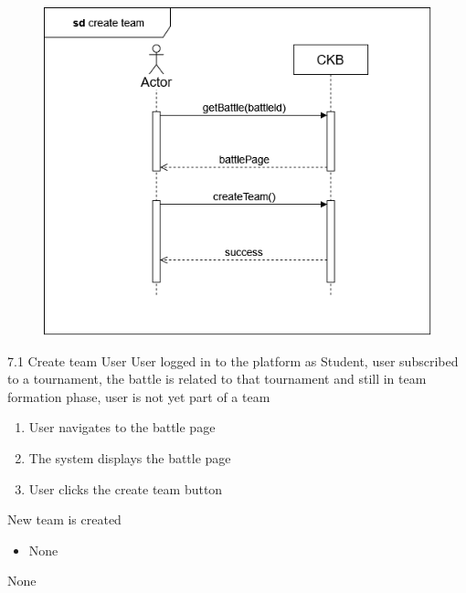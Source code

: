 \usecase
{
    \begin{figure}[H]
        \centering
        \includegraphics[width=\textwidth]{src/sequence_diagrams/createteam.png}
    \end{figure}
}
{7.1}
{Create team} %
{User} %
{User logged in to the platform as Student, user subscribed to a tournament, the battle is related to that tournament and still in team formation phase, user is not yet part of a team} %
{ %
    \begin{enumerate}
        \item User navigates to the battle page
        \item The system displays the battle page
        \item User clicks the create team button
    \end{enumerate}
}
{New team is created} %
{ %
    \begin{itemize}
        \item None
    \end{itemize}
}
{ %
None
}

